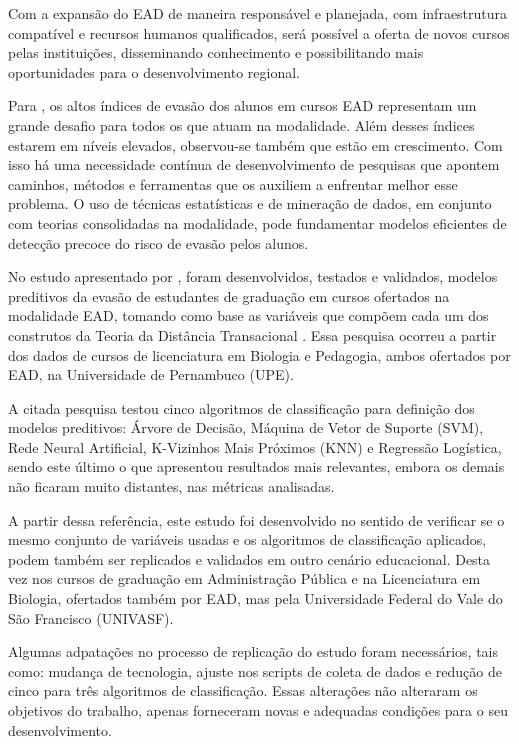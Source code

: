 Com a expansão do EAD de maneira responsável e planejada, com infraestrutura
compatível e recursos humanos qualificados, será possível a oferta de novos
cursos pelas instituições, disseminando conhecimento e possibilitando mais
oportunidades para o desenvolvimento regional.

Para , os altos índices de evasão dos alunos em cursos 
EAD representam um grande desafio para todos os que atuam na modalidade. Além desses 
índices estarem em níveis elevados, observou-se também que estão em crescimento. 
Com isso há uma necessidade contínua de desenvolvimento de pesquisas que apontem caminhos,
métodos e ferramentas que os auxiliem a enfrentar melhor esse problema. O uso de
técnicas estatísticas e de mineração de dados, em conjunto com teorias
consolidadas na modalidade, pode fundamentar modelos eficientes de detecção
precoce do risco de evasão pelos alunos.

No estudo apresentado por , foram desenvolvidos, 
testados e validados, modelos preditivos da evasão de estudantes de graduação em 
cursos ofertados na modalidade EAD, tomando como base as variáveis que compõem cada 
um dos construtos da Teoria da Distância Transacional \cite{moore2008teoria}. Essa 
pesquisa ocorreu a partir dos dados de cursos de licenciatura em Biologia e Pedagogia,
ambos ofertados por EAD, na Universidade de Pernambuco (UPE).

A citada pesquisa testou cinco algoritmos de classificação para definição dos modelos preditivos:  
Árvore de Decisão, Máquina de Vetor de Suporte (SVM), Rede Neural Artificial, K-Vizinhos 
Mais Próximos (KNN) e Regressão Logística, sendo este último o que apresentou resultados mais
relevantes, embora os demais não ficaram muito distantes, nas métricas analisadas.

A partir dessa referência, este estudo foi desenvolvido no sentido de verificar se o mesmo 
conjunto de variáveis usadas e os algoritmos de classificação aplicados, podem também 
ser replicados e validados em outro cenário educacional. Desta vez nos cursos 
de graduação em Administração Pública e na Licenciatura em Biologia, ofertados também 
por EAD, mas pela Universidade Federal do Vale do São Francisco (UNIVASF).

Algumas adpatações no processo de replicação do estudo foram necessários, tais como: mudança 
de tecnologia, ajuste nos scripts de coleta de dados e redução de cinco para três algoritmos 
de classificação. Essas alterações não alteraram os objetivos do trabalho, apenas forneceram
novas e adequadas condições para o seu desenvolvimento.

